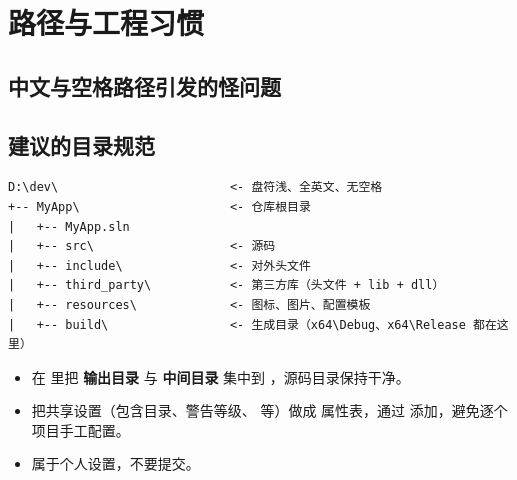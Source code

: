 \section{路径与工程习惯}
\subsection{中文与空格路径引发的怪问题}
\subsection{建议的目录规范}
\begin{lstlisting}[style=textstyle]
D:\dev\                        <- 盘符浅、全英文、无空格
+-- MyApp\                     <- 仓库根目录
|   +-- MyApp.sln
|   +-- src\                   <- 源码
|   +-- include\               <- 对外头文件
|   +-- third_party\           <- 第三方库（头文件 + lib + dll）
|   +-- resources\             <- 图标、图片、配置模板
|   +-- build\                 <- 生成目录（x64\Debug、x64\Release 都在这里）
\end{lstlisting}
\begin{itemize}
  \item 在  里把 \textbf{输出目录} 与 \textbf{中间目录} 集中到 \allowbreak{}，源码目录保持干净。
  \item 把共享设置（包含目录、警告等级、 等）做成  属性表，通过  添加，避免逐个项目手工配置。
  \item {} 属于个人设置，不要提交。
\end{itemize}
